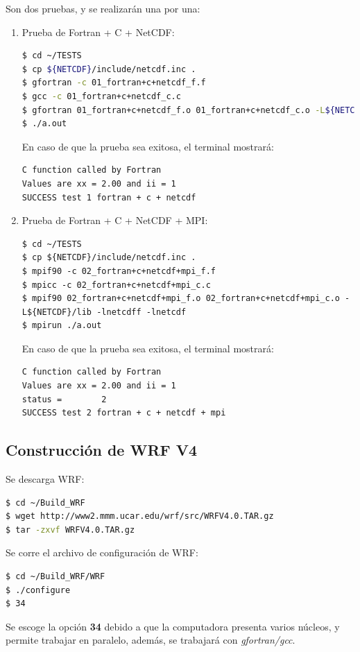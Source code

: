 \documentclass[12pt,letter]{article}
\begin{document}
\noindent Son dos pruebas, y se realizar\'an una por una:
\begin{enumerate}
\item Prueba de Fortran + C + NetCDF:
\begin{lstlisting}[language=bash]
$ cd ~/TESTS
$ cp ${NETCDF}/include/netcdf.inc .
$ gfortran -c 01_fortran+c+netcdf_f.f
$ gcc -c 01_fortran+c+netcdf_c.c
$ gfortran 01_fortran+c+netcdf_f.o 01_fortran+c+netcdf_c.o -L${NETCDF}/lib -lnetcdff -lnetcdf
$ ./a.out
\end{lstlisting}

En caso de que la prueba sea exitosa, el terminal mostrar\'a:
\begin{lstlisting}[language=bash]
C function called by Fortran
Values are xx = 2.00 and ii = 1
SUCCESS test 1 fortran + c + netcdf
\end{lstlisting}

\item Prueba de Fortran + C + NetCDF + MPI:
\begin{lstlisting}
$ cd ~/TESTS
$ cp ${NETCDF}/include/netcdf.inc .
$ mpif90 -c 02_fortran+c+netcdf+mpi_f.f
$ mpicc -c 02_fortran+c+netcdf+mpi_c.c
$ mpif90 02_fortran+c+netcdf+mpi_f.o 02_fortran+c+netcdf+mpi_c.o -L${NETCDF}/lib -lnetcdff -lnetcdf
$ mpirun ./a.out
\end{lstlisting}

En caso de que la prueba sea exitosa, el terminal mostrar\'a:
\begin{lstlisting}[language=bash]
C function called by Fortran
Values are xx = 2.00 and ii = 1
status = 		2
SUCCESS test 2 fortran + c + netcdf + mpi
\end{lstlisting}
\end{enumerate}

\subsection*{Construcci\'on de WRF V4}
Se descarga WRF:
\begin{lstlisting}[language=bash]
$ cd ~/Build_WRF
$ wget http://www2.mmm.ucar.edu/wrf/src/WRFV4.0.TAR.gz
$ tar -zxvf WRFV4.0.TAR.gz
\end{lstlisting}

\noindent Se corre el archivo de configuraci\'on de WRF:
\begin{lstlisting}[language=bash]
$ cd ~/Build_WRF/WRF
$ ./configure
$ 34
\end{lstlisting}
Se escoge la opci\'on \textbf{34} debido a que la computadora presenta varios n\'ucleos, y permite trabajar en paralelo, adem\'as, se trabajar\'a con \textit{gfortran/gcc}.\\
\end{document}
